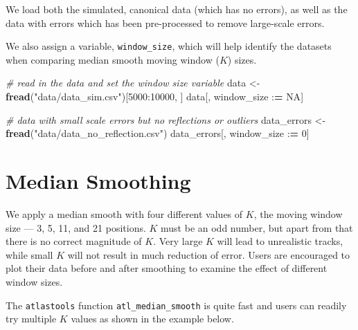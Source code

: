 \documentclass[
]{scrreprt}
\newenvironment{Shaded}{}{}
\newcommand{\CommentTok}[1]{\textcolor[rgb]{0.38,0.63,0.69}{\textit{#1}}}
\newcommand{\DecValTok}[1]{\textcolor[rgb]{0.25,0.63,0.44}{#1}}
\newcommand{\ErrorTok}[1]{\textcolor[rgb]{1.00,0.00,0.00}{\textbf{#1}}}
\newcommand{\KeywordTok}[1]{\textcolor[rgb]{0.00,0.44,0.13}{\textbf{#1}}}
\newcommand{\NormalTok}[1]{#1}
\newcommand{\OperatorTok}[1]{\textcolor[rgb]{0.40,0.40,0.40}{#1}}
\newcommand{\OtherTok}[1]{\textcolor[rgb]{0.00,0.44,0.13}{#1}}
\newcommand{\StringTok}[1]{\textcolor[rgb]{0.25,0.44,0.63}{#1}}
\begin{document}
We load both the simulated, canonical data (which has no errors), as well as the data with errors which has been pre-processed to remove large-scale errors.

We also assign a variable, \texttt{window\_size}, which will help identify the datasets when comparing median smooth moving window (\(K\)) sizes.

\begin{Shaded}
\begin{Highlighting}[]
\CommentTok{\# read in the data and set the window size variable}
\NormalTok{data <{-}}\StringTok{ }\KeywordTok{fread}\NormalTok{(}\StringTok{"data/data\_sim.csv"}\NormalTok{)[}\DecValTok{5000}\OperatorTok{:}\DecValTok{10000}\NormalTok{, ]}
\NormalTok{data[, window\_size }\OperatorTok{:}\ErrorTok{=}\StringTok{ }\OtherTok{NA}\NormalTok{]}

\CommentTok{\# data with small scale errors but no reflections or outliers}
\NormalTok{data\_errors <{-}}\StringTok{ }\KeywordTok{fread}\NormalTok{(}\StringTok{"data/data\_no\_reflection.csv"}\NormalTok{)}
\NormalTok{data\_errors[, window\_size }\OperatorTok{:}\ErrorTok{=}\StringTok{ }\DecValTok{0}\NormalTok{]}
\end{Highlighting}
\end{Shaded}

\hypertarget{median-smoothing}{%
\section{Median Smoothing}\label{median-smoothing}}

We apply a median smooth with four different values of \(K\), the moving window size --- 3, 5, 11, and 21 positions.
\(K\) must be an odd number, but apart from that there is no correct magnitude of \(K\).
Very large \(K\) will lead to unrealistic tracks, while small \(K\) will not result in much reduction of error.
Users are encouraged to plot their data before and after smoothing to examine the effect of different window sizes.

The \texttt{atlastools} function \texttt{atl\_median\_smooth} is quite fast and users can readily try multiple \(K\) values as shown in the example below.
\end{document}
